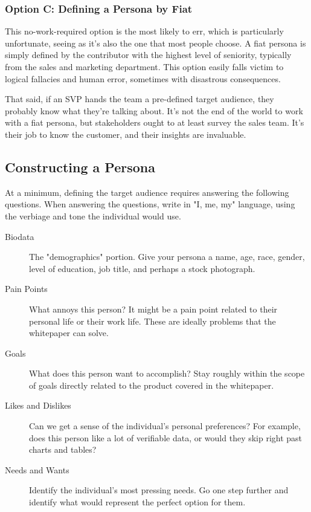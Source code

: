 \documentclass[letterpaper]{article}
\begin{document}
    \subsubsection{Option C: Defining a Persona by Fiat}
    This no-work-required option is the most likely to err, which is particularly unfortunate, seeing as it's also the one that most people choose. A fiat persona is simply defined by the contributor with the highest level of seniority, typically from the sales and marketing department. This option easily falls victim to logical fallacies and human error, sometimes with disastrous consequences. 

    That said, if an SVP hands the team a pre-defined target audience, they probably know what they're talking about. It's not the end of the world to work with a fiat persona, but stakeholders ought to at least survey the sales team. It's their job to know the customer, and their insights are invaluable.

\subsection{Constructing a Persona}
    At a minimum, defining the target audience requires answering the following questions. When answering the questions, write in "I, me, my" language, using the verbiage and tone the individual would use.

    \begin{description}
        \item [Biodata] The "demographics" portion. Give your persona a name, age, race, gender, level of education, job title, and perhaps a stock photograph.
        \item [Pain Points] What annoys this person? It might be a pain point related to their personal life or their work life. These are ideally problems that the whitepaper can solve.
        \item [Goals] What does this person want to accomplish? Stay roughly within the scope of goals directly related to the product covered in the whitepaper.
        \item [Likes and Dislikes] Can we get a sense of the individual's personal preferences? For example, does this person like a lot of verifiable data, or would they skip right past charts and tables?
        \item [Needs and Wants] Identify the individual's most pressing needs. Go one step further and identify what would represent the perfect option for them.
    \end{description}
\end{document}
